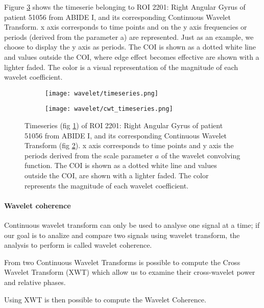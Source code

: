 \documentclass[11pt]{report}
\begin{document}
Figure \ref{fig:cwt_timeseries} shows the timeserie belonging to ROI 2201: Right Angular Gyrus of patient 51056 from ABIDE I, and its corresponding Continuous Wavelet Transform.
x axis corresponds to time points and on the y axis frequencies or periods (derived from the parameter a) are represented. Just as an example, we choose to display the y axis as periods.
The COI is shown as a dotted white line and values outside the COI, where edge effect becomes effective are shown with a lighter faded.
The color is a visual representation of the magnitude of each wavelet coefficient.

\begin{figure}
\begin{subfigure}{0.5\textwidth}
\texttt{[image: wavelet/timeseries.png]}
\caption{}
\label{fig:timeseries_cwt}
\end{subfigure}
\begin{subfigure}{0.5\textwidth}
\texttt{[image: wavelet/cwt\_timeseries.png]}
\caption{}
\label{fig:cwt}
\end{subfigure}
\caption{Timeseries (fig \ref{fig:timeseries_cwt}) of ROI 2201: Right Angular Gyrus of patient 51056 from ABIDE I, and its corresponding Continuous Wavelet Transform  (fig \ref{fig:cwt}).
x axis corresponds to time points and y axis the periods derived from the scale parameter $a$ of the wavelet convolving function.
The COI is shown as a dotted white line and values outside the COI, are shown with a lighter faded.
The color represents the magnitude of each wavelet coefficient.}
\label{fig:cwt_timeseries}
\end{figure}



\paragraph{Wavelet coherence} \hfill \newline

Continuous wavelet transform can only be used to analyse one signal at a time; if our goal is to analize and compare two signals using wavelet transform, the analysis to perform is called wavelet coherence.

From two Continuous Wavelet Transforms is possible to compute the Cross Wavelet Transform (XWT) which allow us to examine their cross-wavelet power and relative phases.

Using XWT is then possible to compute the Wavelet Coherence.
\end{document}
